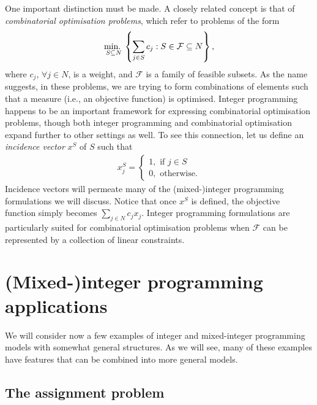 One important distinction must be made. A closely related concept is that of \emph{combinatorial optimisation problems}, which refer to problems of the form
%
\begin{align*}
 	\mathop{\text{min.~}}_{S \subseteq N} \left\{ \sum_{j \in S} c_j : S \in \mathcal{F} \subseteq N \right \},
\end{align*}
%
where $c_j$, $\forall j \in N$, is a weight, and $\mathcal{F}$ is a family of feasible subsets. As the name suggests, in these problems, we are trying to form combinations of elements such that a measure (i.e., an objective function) is optimised. Integer programming happens to be an important framework for expressing combinatorial optimisation problems, though both integer programming and combinatorial optimisation expand further to other settings as well. To see this connection, let us define an \emph{incidence vector} $x^S$ of $S$ such that
%
  \begin{align*}
	  x^S_j = \begin{cases}
	       1, \text{ if } j \in S \\ 
	       0, \text{ otherwise}.
	     \end{cases}
  \end{align*}
%
Incidence vectors will permeate many of the (mixed-)integer programming formulations we will discuss. Notice that once $x^S$ is defined, the objective function simply becomes $\sum_{j \in N} c_j x_j$. Integer programming formulations are particularly suited for combinatorial optimisation problems when $\mathcal{F}$ can be represented by a collection of linear constraints. 


\section{(Mixed-)integer programming applications}

We will consider now a few examples of integer and mixed-integer programming models with somewhat general structures. As we will see, many of these examples have features that can be combined into more general models.


\subsection{The assignment problem}

